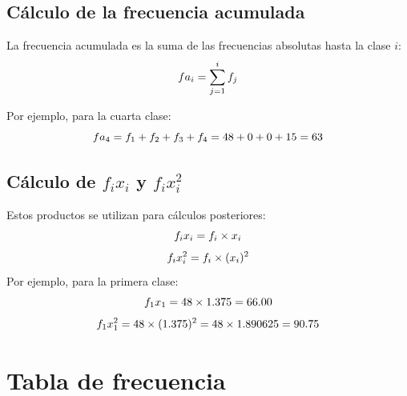 \documentclass[
  spanish,
  letterpaper,
]{book}
\begin{document}
\subsection{Cálculo de la frecuencia
acumulada}\label{cuxe1lculo-de-la-frecuencia-acumulada}

La frecuencia acumulada es la suma de las frecuencias absolutas hasta la
clase \(i\): \[\huge fa_i = \sum_{j=1}^{i} f_j\]

Por ejemplo, para la cuarta clase:
\[ \Large fa_4 = f_1 + f_2 + f_3 + f_4 = 48 + 0 + 0 + 15 = 63\]

\subsection{\texorpdfstring{Cálculo de \(f_i x_i\)\hspace{0pt} y
\(f_i x_i^2\)}{Cálculo de f\_i x\_i\hspace{0pt} y f\_i x\_i\^{}2}}\label{cuxe1lculo-de-f_i-x_i-y-f_i-x_i2}

Estos productos se utilizan para cálculos posteriores:
\[\huge f_i x_i = f_i \times x_i\]
\[\huge f_i x_i^2 = f_i \times (x_i)^2\] Por ejemplo, para la primera
clase: \[\LARGE f_1 x_1 = 48 \times 1.375 = 66.00\]
\[\LARGE f_1 x_1^2 = 48 \times (1.375)^2 = 48 \times 1.890625 = 90.75\]

\section{Tabla de frecuencia}\label{tabla-de-frecuencia}
\end{document}
